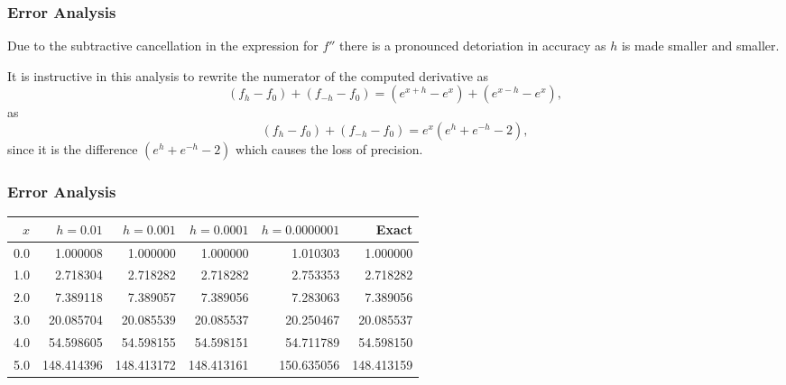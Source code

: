 \documentclass[compress]{beamer}
\begin{document}
\frame
{
  \frametitle{Error Analysis}
  \begin{block}{}
\begin{small}
{\scriptsize
Due to the subtractive cancellation in the expression
for $f''$ there is a pronounced detoriation in accuracy as $h$ is made smaller
and smaller.

It is instructive in this analysis to rewrite the numerator of
the computed derivative as
\[
   (f_h -f_0) +(f_{-h}-f_0)=(e^{x+h}-e^{x}) + (e^{x-h}-e^{x}),
\]
as
\[
   (f_h -f_0) +(f_{-h}-f_0)=e^x(e^{h}+e^{-h}-2),
\]
since it is the difference $(e^{h}+e^{-h}-2)$ which causes
the loss of precision.
}
\end{small}
  \end{block}
}


\frame
{
  \frametitle{Error Analysis}
  \begin{block}{}
\begin{small}
{\scriptsize
\begin{tabular}{rrrrrr}\hline
$x$&$h=0.01$&$h=0.001$&$h=0.0001$&$h=0.0000001$ &Exact\\\hline
  0.0&   1.000008 &   1.000000 &   1.000000 &   1.010303 &   1.000000  \\
 1.0&   2.718304  &  2.718282  &  2.718282  &  2.753353  &  2.718282  \\
 2.0&  7.389118  &  7.389057  &  7.389056  &  7.283063  &  7.389056  \\
 3.0&  20.085704 &  20.085539 &  20.085537 &  20.250467 &  20.085537   \\
 4.0&  54.598605 &  54.598155  & 54.598151 &  54.711789  & 54.598150  \\
 5.0& 148.414396 & 148.413172 & 148.413161 & 150.635056 & 148.413159 \\\hline
\end{tabular}
}
\end{small}
  \end{block}
}
\end{document}
